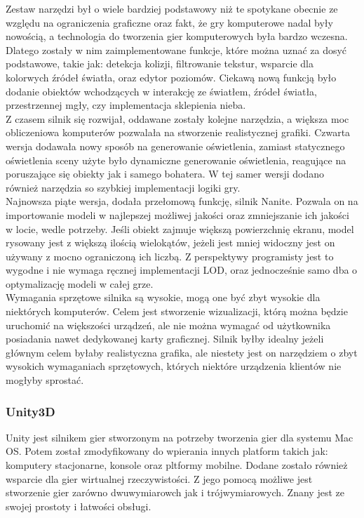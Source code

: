 \documentclass{article} %
\begin{document}
        Zestaw narzędzi był o wiele bardziej podstawowy niż te spotykane obecnie ze względu na ograniczenia graficzne oraz fakt, że gry komputerowe nadal były nowością, a technologia do tworzenia gier komputerowych była bardzo wczesna. Dlatego zostały w nim zaimplementowane funkcje, które można uznać za dosyć podstawowe, takie jak: detekcja kolizji, filtrowanie tekstur, wsparcie dla kolorwych źródeł światła, oraz edytor poziomów. Ciekawą nową funkcją było dodanie obiektów wchodzących w interakcję ze światłem, źródeł światła, przestrzennej mgły, czy implementacja sklepienia nieba.
        \\
        
        Z czasem silnik się rozwijał, oddawane zostały kolejne narzędzia, a większa moc obliczeniowa komputerów pozwalała na stworzenie realistycznej grafiki. Czwarta wersja dodawała nowy sposób na generowanie oświetlenia, zamiast statycznego oświetlenia sceny użyte było dynamiczne generowanie oświetlenia, reagujące na poruszające się obiekty jak i samego bohatera. W tej samer wersji dodano również narzędzia so szybkiej implementacji logiki gry.
        \\
        
        Najnowsza piąte wersja, dodała przełomową funkcję, silnik Nanite. Pozwala on na importowanie modeli w najlepszej możliwej jakości oraz zmniejszanie ich jakości w locie, wedle potrzeby. Jeśli obiekt zajmuje większą powierzchnię ekranu, model rysowany jest z większą ilością wielokątów, jeżeli jest mniej widoczny jest on używany z mocno ograniczoną ich liczbą. Z perspektywy programisty jest to wygodne i nie wymaga ręcznej implementacji LOD, oraz jednocześnie samo dba o optymalizację modeli w całej grze.
        \\
        
        Wymagania sprzętowe silnika są wysokie, mogą one być zbyt wysokie dla niektórych komputerów. Celem jest stworzenie wizualizacji, którą można będzie uruchomić na większości urządzeń, ale nie można wymagać od użytkownika posiadania nawet dedykowanej karty graficznej. Silnik byłby idealny jeżeli głównym celem byłaby realistyczna grafika, ale niestety jest on narzędziem o zbyt wysokich wymaganiach sprzętowych, których niektóre urządzenia klientów nie mogłyby sprostać.
        \\
        
        \subsubsection*{Unity3D}
        Unity jest silnikem gier stworzonym na potrzeby tworzenia gier dla systemu Mac OS. Potem został zmodyfikowany do wpierania innych platform takich jak: komputery stacjonarne, konsole oraz pltformy mobilne. Dodane zostało również wsparcie dla gier wirtualnej rzeczywistości. Z jego pomocą możliwe jest stworzenie gier zarówno dwuwymiarowch jak i trójwymiarowych. Znany jest ze swojej prostoty i łatwości obsługi.
        \\
        
\end{document}
